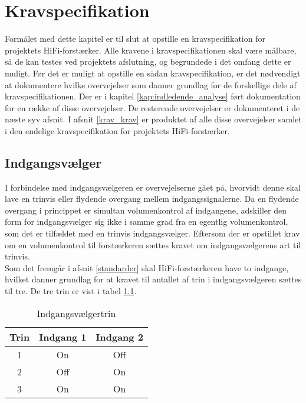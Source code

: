\chapter{Kravspecifikation}
\label{kravspec}
Formålet med dette kapitel er til slut at opstille en kravspecifikation for projektets HiFi-forstærker. Alle kravene i kravspecifikationen skal være målbare, så de kan testes ved projektets afslutning, og begrundede i det omfang dette er muligt. Før det er muligt at opstille en sådan kravspecifikation, er det nødvendigt at dokumentere hvilke overvejelser som danner grundlag for de forskellige dele af kravspecifikationen. Der er i kapitel \ref{kap:indledende_analyse} ført dokumentation for en række af disse overvejelser. De resterende overvejelser er dokumenteret i de næste syv afsnit. I afsnit \ref{krav_krav} er produktet af alle disse overvejelser samlet i den endelige kravspecifikation for projektets HiFi-forstærker. 

\section{Indgangsvælger}
\label{krav_indgangsvaelger}
I forbindelse med indgangsvælgeren er overvejelserne gået på, hvorvidt denne skal lave en trinvis eller flydende overgang mellem indgangssignalerne. Da en flydende overgang i princippet er simultan volumenkontrol af indgangene, adskiller den form for indgangsvælger sig ikke i samme grad fra en egentlig volumenkontrol, som det er tilfældet med en trinvis indgangsvælger. Eftersom der er opstillet krav om en volumenkontrol til forstærkeren sættes kravet om indgangsvælgerens art til trinvis. \\
Som det fremgår i afsnit \ref{standarder} skal HiFi-forstærkeren have to indgange, hvilket danner grundlag for at kravet til antallet af trin i indgangsvælgeren sættes til tre. De tre trin er vist i tabel \ref{tab:indgangsvaelgertrin}.

\begin{table}[h]
\centering
\begin{tabular}{c|c|c}
\hline\hline
Trin & Indgang 1 & Indgang 2 \\
\hline\hline
1 & On & Off \\
2 & Off & On \\
3 & On & On \\
\hline\hline
\end{tabular}
\caption{Indgangsvælgertrin}
\label{tab:indgangsvaelgertrin}
\end{table}

